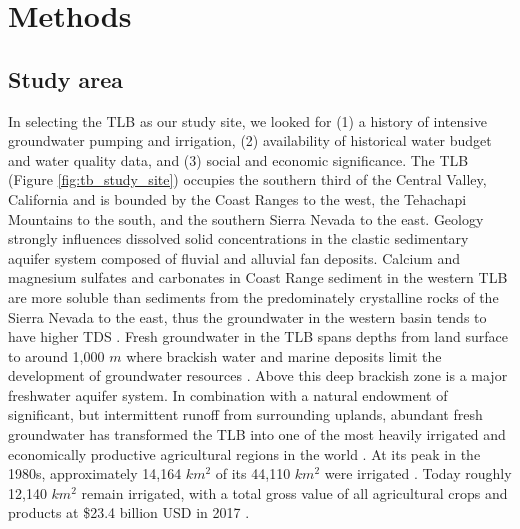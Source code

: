 \section{Methods}

\subsection{Study area}
\label{ss_2_1}

In selecting the TLB as our study site, we looked for (1) a history of intensive groundwater pumping and irrigation, (2) availability of historical water budget and water quality data, and (3) social and economic significance. The TLB (Figure \ref{fig:tb_study_site}) occupies the southern third of the Central Valley, California and is bounded by the Coast Ranges to the west, the Tehachapi Mountains to the south, and the southern Sierra Nevada to the east. Geology strongly influences dissolved solid concentrations in the clastic sedimentary aquifer system composed of fluvial and alluvial fan deposits. Calcium and magnesium sulfates and carbonates in Coast Range sediment in the western TLB are more soluble than sediments from the predominately crystalline rocks of the Sierra Nevada to the east, thus the groundwater in the western basin tends to have higher TDS \citep{Fujii1995, belitz1990, deverel1988}. Fresh groundwater in the TLB spans depths from land surface to around 1,000 $m$ where brackish water and marine deposits limit the development of groundwater resources \citep{Program2010, Kang2016}. Above this deep brackish zone is a major freshwater aquifer system. In combination with a natural endowment of significant, but intermittent runoff from surrounding uplands, abundant fresh groundwater has transformed the TLB into one of the most heavily irrigated and economically productive agricultural regions in the world \citep{Hanak2011}. At its peak in the 1980s, approximately 14,164 $km^2$ of its 44,110 $km^2$ were irrigated \citep{TNC2014}. Today roughly 12,140 $km^2$ remain irrigated, with a total gross value of all agricultural crops and products at \$23.4 billion USD in 2017 \citep{kern2018, kings2018, fresno2018, tulare2018}. \\


